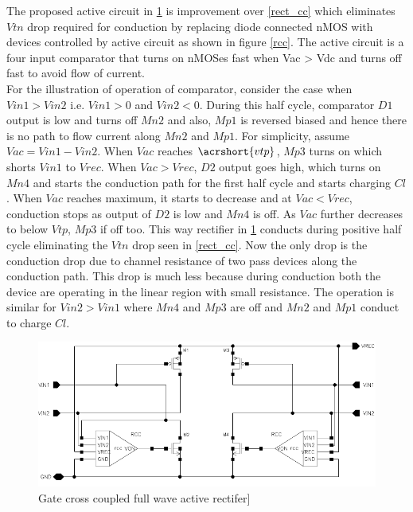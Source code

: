 \documentclass[UKenglish]{ifimaster}  %
\begin{document}
The proposed active circuit in \ref{rect_rcc} is improvement over \ref{rect_cc} which eliminates $Vtn$ drop required for conduction by replacing diode connected nMOS with devices controlled by active circuit as shown in figure \ref{rcc}. The active circuit is a four input comparator that turns on nMOSes fast when Vac > Vdc and turns off fast to avoid flow of current. \\

For the illustration of operation of comparator, consider the case when $Vin1 > Vin2$ i.e. $Vin1 > 0$ and $Vin2 < 0$. During this half cycle, comparator $D1$ output is low and turns off $Mn2$ and also, $Mp1$ is reversed biased and hence there is no path to flow current along $Mn2$ and $Mp1$. For simplicity, assume $Vac =  Vin1 - Vin2$. When $Vac$ reaches $\acrshort{vtp}$, $Mp3$ turns on which shorts $Vin1$ to $Vrec$. When $Vac > Vrec$, $D2$ output goes high, which turns on $Mn4$ and starts the conduction path for the first half cycle and starts charging $Cl$. When $Vac$ reaches maximum, it starts to decrease and at $Vac < Vrec$, conduction stops as output of $D2$ is low and $Mn4$ is off. As $Vac$ further decreases to below $Vtp$, $Mp3$ if off too. This way rectifier in \ref{rect_rcc}  conducts during positive half cycle eliminating the $Vtn$ drop seen in \ref{rect_cc}. Now the only drop is the conduction drop due to channel resistance of two pass devices along the conduction path. This drop is much less because during conduction both the device are operating in the linear region with small resistance. The operation is similar for $Vin2 > Vin1$ where $Mn4$ and $Mp3$ are off and $Mn2$ and $Mp1$ conduct to charge $Cl$. \\

\begin{figure}[htbp] %
   \centering
   \includegraphics[width=\textwidth]{img/rectifier_schematic.pdf} 
   \caption{Gate cross coupled full wave active rectifer]}
   \label{rect_rcc}
\end{figure}
\end{document}
